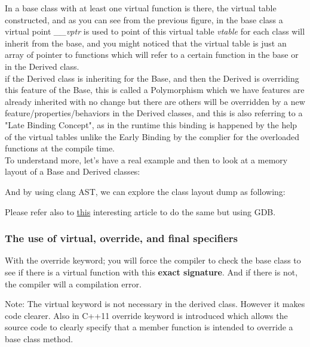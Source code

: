 \documentclass{article}
\begin{document}
In a base class with at least one virtual function is there, the virtual table constructed, and as you can see from the previous figure, in the base class a virtual point \textit{\_\_vptr} is used to point of this virtual table \textit{vtable} for each class will inherit from the base, and you might noticed that the virtual table is just an array of pointer to functions which will refer to a certain function in the base or in the Derived class.\\
if the Derived class is inheriting for the Base, and then the Derived is overriding this feature of the Base, this is called a Polymorphism which we have features are already inherited with no change but there are others will be overridden by a new feature/properties/behaviors in the Derived classes, and this is also referring to a "Late Binding Concept", as in the runtime this binding is happened by the help of the virtual tables unlike the Early Binding by the complier for the overloaded functions at the compile time.\\

To understand more, let's have a real example and then to look at a memory layout of a Base and Derived classes:



And by using clang AST, we can explore the class layout dump as following:



Please refer also to \href{https://shaharmike.com/cpp/vtable-part1/}{this} interesting article to do the same but using GDB.


\subsubsection{The use of virtual, override, and final specifiers}


With the override keyword; you will force the compiler to check the base class to see if there is a virtual function with this \textbf{exact signature}. And if there is not, the compiler will a compilation error.

Note:
The virtual keyword is not necessary in the derived class. However it makes code clearer. Also in C++11 override keyword is introduced which allows the source code to clearly specify that a member function is intended to override a base class method.
\end{document}

